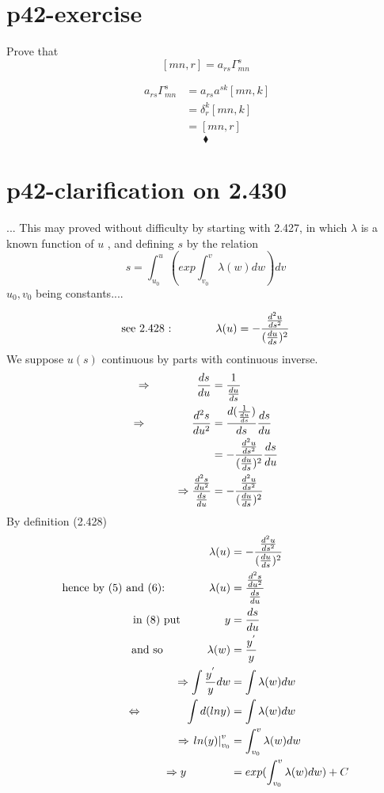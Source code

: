 \section{p42-exercise}
\begin{tcolorbox}
Prove that  $$ [mn,r] = a_{rs}\Gamma^s_{mn}$$
\end{tcolorbox}
\begin{align*}
\ a_{rs}\Gamma^s_{mn} & = a_{rs}a^{sk}[mn,k]\\
\ & = \delta^k_r[mn,k]\\
\ &= [mn,r]
\end{align*}
$$\blacklozenge$$
\newpage

\section{p42-clarification on 2.430}
\begin{tcolorbox}
... This may proved without difficulty by starting with 2.427, in which $\lambda$ is a known function of $u$ , and defining $s$ by the relation$$ s = \int^u_{u_0}(exp\int^v_{v_0} \lambda(w)dw)dv$$ $u_0, v_0$ being constants....
\end{tcolorbox}
\begin{align}
\text{see 2.428 :} \quad\quad\quad\quad  \lambda (u)=-\frac{\dv[2]{u}{s}}{(\dv{u}{s})^2}
\end{align}
We suppose $u(s)$ continuous by parts with continuous inverse.
\begin{align}
\Rightarrow \quad\quad\quad\quad  \dv{s}{u} &= \frac{1}{\dv{u}{s}}\\
\Rightarrow \quad\quad\quad\quad \dv[2]{s}{u}&= \dv{(\frac{1}{\dv{u}{s}})}{s}\dv{s}{u}\\
\ & = -\frac{\dv[2]{u}{s}}{(\dv{u}{s})^2}\dv{s}{u}\\
\Rightarrow \frac{\dv[2]{s}{u}}{\dv{s}{u}} &= - \frac{\dv[2]{u}{s}}{(\dv{u}{s})^2}  
\end{align}
By definition (2.428)
\begin{align}
\ \lambda (u) &= - \frac{\dv[2]{u}{s}}{(\dv{u}{s})^2}\\
\text{hence by (5) and (6):}\quad\quad\quad\quad   \lambda (u) &= \frac{\dv[2]{s}{u}}{\dv{s}{u}}\\
\text{in (8) put}\quad\quad\quad\quad  y &= \dv{s}{u} \\
\text{ and so} \quad\quad\quad\quad  \lambda (w)  &= \frac{y^{'}}{y}\\
\Rightarrow \int \frac{y^{'}}{y}dw &= \int \lambda (w)dw\\
\Leftrightarrow \quad\quad\quad\quad  \int d(lny) &= \int \lambda (w)dw\\
\Rightarrow \left. ln(y) \right|^v_{v_0} &= \int^v_{v_0} \lambda (w)dw\\
\Rightarrow y  \quad\quad\quad\quad  &= exp(\int^v_{v_0} \lambda (w)dw) + C
\end{align}
